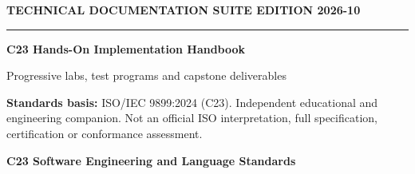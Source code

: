 \documentclass[10pt,letterpaper,oneside]{report}
\begin{document}
\hypersetup{pageanchor=false}%
\begin{titlepage}
\color{ink}\vspace*{1.2in}
{\sffamily\small\color{accent}\bfseries TECHNICAL DOCUMENTATION SUITE \hfill EDITION 2026-10}\par
\vspace{.3in}\rule{\linewidth}{1.5pt}\par\vspace{.22in}
{\LARGE\bfseries C23 Hands-On Implementation Handbook}\par\vspace{.22in}
{\Large\color{grayblue}Progressive labs, test programs and capstone deliverables}\par\vspace{.4in}
\begin{keybox}\textbf{Standards basis:} ISO/IEC 9899:2024 (C23). Independent educational and engineering companion. Not an official ISO interpretation, full specification, certification or conformance assessment.\end{keybox}
\vfill{\large\bfseries C23 Software Engineering and Language Standards}\par{}\par
\end{titlepage}\hypersetup{pageanchor=true}
\tableofcontents\clearpage{}
\end{document}
